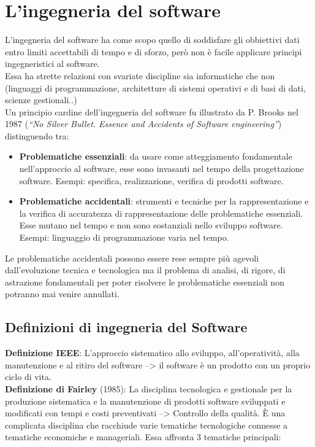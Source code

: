 \section{L'ingegneria del software}
L'ingegneria del software ha come scopo quello di soddisfare gli obbiettivi dati entro limiti accettabili di tempo e di sforzo, però non  è facile applicare principi ingegneristici al software.\\
Essa ha strette relazioni con svariate discipline sia informatiche che non (linguaggi di programmazione, architetture di sistemi operativi e di basi di dati, scienze gestionali..)\\
Un principio cardine dell'ingegneria del software fu illustrato da P. Brooks nel 1987 (\textit{``No Silver Bullet. Essence and Accidents of Software engineering''}) distinguendo tra:
\begin{itemize}
\item \textbf{Problematiche essenziali}: da usare come atteggiamento fondamentale nell'approccio al software, esse sono invasanti nel tempo della progettazione software. Esempi: specifica, realizzazione, verifica di prodotti software.
\item \textbf{Problematiche accidentali}: strumenti e tecniche per la rappresentazione e la verifica di accuratezza di rappresentazione delle problematiche essenziali. Esse mutano nel tempo e non sono sostanziali nello sviluppo software. Esempi: linguaggio di programmazione varia nel tempo.
\end{itemize}

Le problematiche accidentali possono essere rese sempre più agevoli dall'evoluzione tecnica e tecnologica ma il problema di analisi, di rigore, di astrazione fondamentali per poter risolvere le problematiche essenziali non potranno mai venire annullati.
\subsection{Definizioni di ingegneria del Software}
\textbf{Definizione IEEE}: L'approccio sistematico allo sviluppo, all'operatività, alla manutenzione e al ritiro del software --> il software è un prodotto con un proprio ciclo di vita.\\
\textbf{Definizione di Fairley} (1985): La disciplina tecnologica e gestionale per la produzione sistematica e la manutenzione di prodotti software sviluppati e modificati con tempi e costi preventivati --> Controllo della qualità.
\`{E} una complicata disciplina che racchiude varie tematiche tecnologiche connesse a tematiche economiche e manageriali. Essa affronta 3 tematiche principali:

